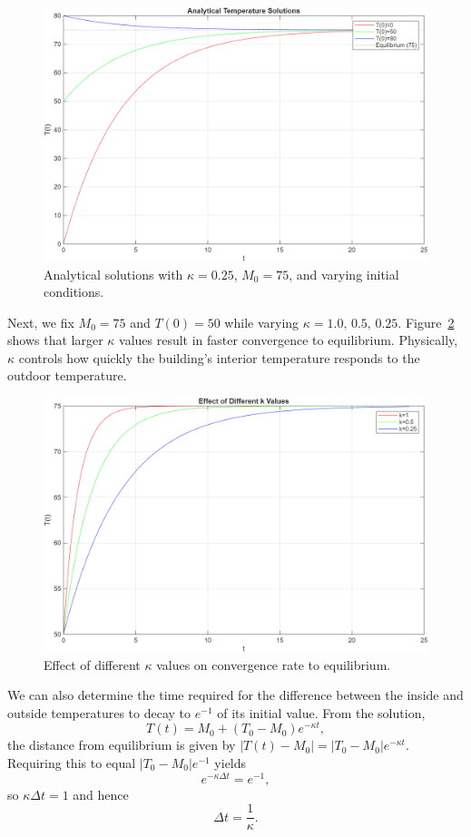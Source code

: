 \documentclass[12pt]{article}
\begin{document}
\begin{figure}[H]
    \centering
    \includegraphics[width=0.75\linewidth]{images/Task_A1.png}
    \caption{Analytical solutions with $\kappa=0.25$, $M_0=75$, and varying initial conditions.}
    \label{fig:TaskA1}
\end{figure}

Next, we fix $M_0=75$ and $T(0)=50$ while varying $\kappa=1.0,\,0.5,\,0.25$. Figure~\ref{fig:TaskA2} shows that larger $\kappa$ values result in faster convergence to equilibrium. Physically, $\kappa$ controls how quickly the building’s interior temperature responds to the outdoor temperature.

\begin{figure}[H]
    \centering
    \includegraphics[width=0.75\linewidth]{images/Task_A2.png}
    \caption{Effect of different $\kappa$ values on convergence rate to equilibrium.}
    \label{fig:TaskA2}
\end{figure}
We can also determine the time required for the difference between the inside and outside temperatures to decay to $e^{-1}$ of its initial value. From the solution,
\begin{equation}
T(t) = M_0 + (T_0 - M_0)e^{-\kappa t},
\label{eq:closed_repeat}
\end{equation}
the distance from equilibrium is given by $|T(t)-M_0| = |T_0 - M_0|e^{-\kappa t}$. Requiring this to equal $|T_0 - M_0|e^{-1}$ yields
\begin{equation}
e^{-\kappa \Delta t} = e^{-1},
\end{equation}
so $\kappa \Delta t = 1$ and hence
\begin{equation}
\Delta t = \frac{1}{\kappa}.
\label{eq:timeconst}
\end{equation}
\end{document}
